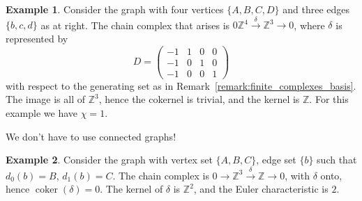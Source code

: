 \documentclass{tufte-handout}
\def\ZZ{\mathbb{Z}}
\DeclareMathOperator{\coker}{coker}
\theoremstyle{definition}
\newtheorem{example}{Example}
\begin{document}
\begin{example}\label{eg:triangle_graph}
Consider 
the graph with four vertices $\{A,B,C,D\}$ and three edges $\{b,c,d\}$ as at right. The chain complex that arises is $0\ZZ^4\xrightarrow{\delta} \ZZ^3 \to 0$, where $\delta$ is represented by
\[
	D = \begin{pmatrix}
		-1 & 1 & 0 & 0\\
		-1 & 0 & 1 & 0\\
		-1 & 0 & 0 & 1
	\end{pmatrix}
\]
with respect to the generating set as in Remark~\ref{remark:finite_complexes_basis}. The 
image is all of $\ZZ^3$, hence the cokernel is trivial, and the kernel is $\ZZ$. For 
this example we have $\chi = 1$.
\end{example}

We don't have to use connected graphs!

\begin{example}
Consider
the graph with vertex set $\{A,B,C\}$, edge set $\{b\}$ such that $d_0(b)=B$, 
 $d_1(b)=C$. The chain complex is $0\to \ZZ^3 \xrightarrow{\delta} \ZZ \to 0$, with 
 $\delta$ onto, hence $\coker(\delta)=0$. The kernel of $\delta$ is $\ZZ^2$, and the 
 Euler characteristic is $2$.

\end{example}
\end{document}

